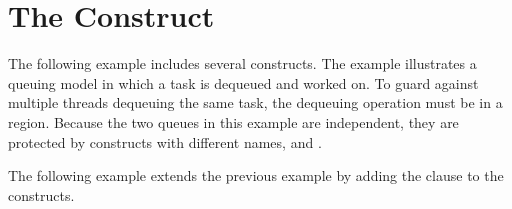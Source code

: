\pagebreak
\section{The  Construct}
\label{sec:critical}

The following example includes several  constructs. The example 
illustrates a queuing model in which a task is dequeued and worked on. To guard 
against multiple threads dequeuing the same task, the dequeuing operation must 
be in a  region. Because the two queues in this example are independent, 
they are protected by  constructs with different names,  
and .



The following example extends the previous example by adding the  clause to the  constructs.


